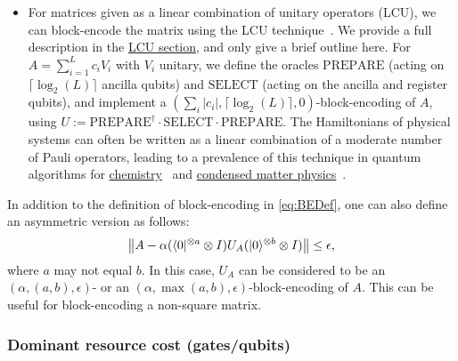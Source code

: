\begin{refsection}
\begin{itemize}
\item For matrices given as a linear combination of unitary operators (LCU), we can block-encode the matrix using the LCU technique~\cite{childs2012HamSimLCU}. We provide a full description in the \hyperref[prim:LCU]{LCU section}, and only give a brief outline here. For $A = \sum_{i=1}^L c_i V_i$ with $V_i$ unitary, we define the oracles $\mathrm{PREPARE}$ (acting on $\lceil \log_2(L)\rceil$ ancilla qubits) and $\mathrm{SELECT}$ (acting on the ancilla and register qubits), and implement a $(\sum_i |c_i|, \lceil \log_2(L)\rceil, 0)$-block-encoding of $A$, using $U := \mathrm{PREPARE}^\dag \cdot \mathrm{SELECT} \cdot \mathrm{PREPARE}$. The Hamiltonians of physical systems can often be written as a linear combination of a moderate number of Pauli operators, leading to a prevalence of this technique in quantum algorithms for \hyperref[appl:ElectronicStructure]{chemistry}~\cite{babbush2018EncodingElectronicSpectraLinearT,Berry2019QubitizationOfArbitraryBasisChemistry} and \hyperref[appl:CondensedMatter]{condensed matter physics}~\cite{babbush2018EncodingElectronicSpectraLinearT,childs2018towardsFirstQSimSpeedup,Wan2021exponentiallyfaster}.
\end{itemize}

In addition to the definition of block-encoding in \eqref{eq:BEDef}, one can also define an asymmetric version as follows:
\begin{equation}
\left\lVert A - \alpha (\langle0\rvert^{\otimes a} \otimes I )U_A(\lvert0\rangle^{\otimes b} \otimes I)\right\rVert \leq \epsilon,
\end{equation}
where $a$ may not equal $b$. In this case, $U_A$ can be considered to be an $(\alpha, (a,b), \epsilon)$- or an $(\alpha, \max(a,b), \epsilon)$-block-encoding of $A$. This can be useful for block-encoding a non-square matrix. 


\subsubsection*{Dominant resource cost (gates/qubits)}


\end{refsection}
